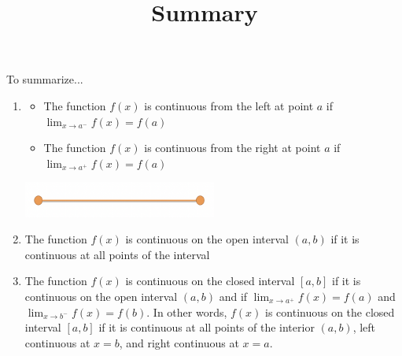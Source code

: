 \documentclass{ximera}
\title{Summary}
\begin{document}
\begin{abstract}
\end{abstract}

\maketitle

To summarize...

\begin{explanation}
    \begin{enumerate}
        \item \begin{itemize}
            \item The function $f(x)$ is continuous from the left at point $a$ if $\lim_{x \to a^-} f(x) = f(a)$
            \item The function $f(x)$ is continuous from the right at point $a$ if $\lim_{x \to a^+} f(x) = f(a)$
        \end{itemize}
        \begin{center}            
        \includegraphics[width=0.5\textwidth]{graph4.png}
        \end{center}

    \item The function $f(x)$ is continuous on the open interval $(a,b)$ if it is continuous at all points of the interval

    \item The function $f(x)$ is continuous on the closed interval $[a,b]$ if it is continuous on the open interval $(a,b)$ and if $\lim_{x \to a^+} f(x) = f(a)$ and $\lim_{x \to b^-} f(x) = f(b)$.
        In other words, $f(x)$ is continuous on the closed interval $[a,b]$ if it is continuous at all points of the interior $(a,b)$, left continuous at $x=b$, and right continuous at $x=a$.
    \end{enumerate}
\end{explanation}
\end{document}
